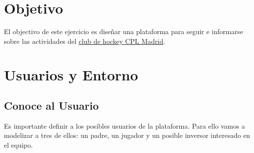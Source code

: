\documentclass[10pt, spanish, pdftex]{template/UC3M_document}
\author{Alejandro Prieto Macías}         %
\begin{document}
\titleMain

\begin{spacing}{0.5}
    \hypersetup{linkcolor=black}    %
    \tableofcontents\newpage        %
\end{spacing}


\section{Objetivo}
El objectivo de este ejercicio es diseñar una plataforma para seguir e informarse sobre las actividades del \href{http://www.cplmadrid.com}{club de hockey CPL Madrid}.

\newpage

\section{Usuarios y Entorno}
\subsection{Conoce al Usuario}
Es importante definir a los posibles usuarios de la plataforma. Para ello vamos a modelizar a tres de ellos: un padre, un jugador y un posible inversor interesado en el equipo.
\end{document}
